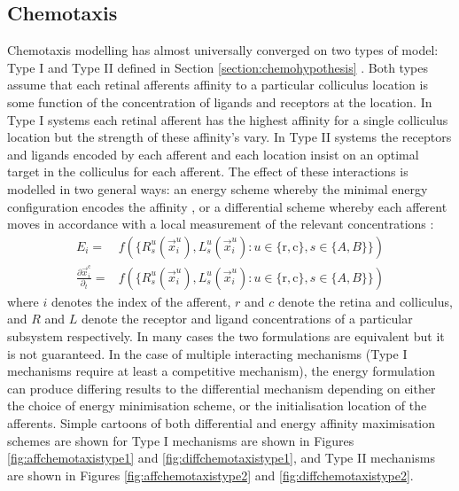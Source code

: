 \subsection{Chemotaxis \label{sec:chemotaxismodelling}}
Chemotaxis modelling has almost universally converged on two types of model: Type I and Type II  defined in Section \ref{section:chemohypothesis} \cite{Hjorth2015-le}. Both types assume that each retinal afferents affinity to a particular colliculus location is some function of the concentration of ligands and receptors at the location. In Type I systems each retinal afferent has the highest affinity for a single colliculus location but the strength of these affinity's vary. In Type II systems the receptors and ligands encoded by each afferent and each location insist on an optimal target in the colliculus for each afferent. The effect of these interactions is modelled in two general ways: an energy scheme whereby the minimal energy configuration encodes the affinity \cite{Willshaw_D_J1979-eg, Koulakov2004-ia, Tsigankov2006-uy, Tsigankov2010-on, Triplett2011-jk, Gierer1981-qc}, or a differential scheme whereby each afferent moves in accordance with a local measurement of the relevant concentrations \cite{Simpson2011-zh, Sterratt2013-ev, Gierer1983-tn, Willshaw2006-if}:
\begin{align}
E_i =& f\left(\{R^u_s(\vec{x}^u_i), L^u_s(\vec{x}^u_i): u \in \{\text{r}, \text{c}\}, s \in \{A, B\} \}\right)\\
\frac{\partial\vec{x}^\text{c}_i}{\partial_t} =& f\left(\{R^u_s(\vec{x}^u_i), L^u_s(\vec{x}^u_i) : u \in \{\text{r}, \text{c}\}, s \in \{A, B\} \}\right) 
\end{align}
where $i$ denotes the index of the afferent, $r$ and $c$ denote the retina and colliculus, and $R$ and $L$ denote the receptor and ligand concentrations of a particular subsystem respectively. In many cases the two formulations are equivalent but it is not guaranteed. In the case of multiple interacting mechanisms (Type I mechanisms require at least a competitive mechanism), the energy formulation can produce differing results to the differential mechanism depending on either the choice of energy minimisation scheme, or the initialisation location of the afferents. Simple cartoons of both differential and energy affinity maximisation schemes are shown for Type I mechanisms are shown in Figures \ref{fig:affchemotaxistype1} and \ref{fig:diffchemotaxistype1}, and Type II mechanisms are shown in Figures \ref{fig:affchemotaxistype2} and \ref{fig:diffchemotaxistype2}. 

